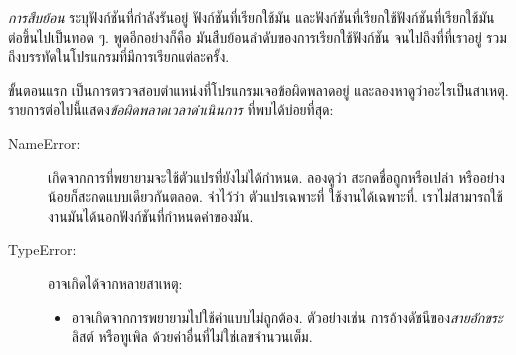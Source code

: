 \textit{การสืบย้อน} ระบุฟังก์ชันที่กำลังรันอยู่
ฟังก์ชันที่เรียกใช้มัน และฟังก์ชันที่เรียกใช้ฟังก์ชันที่เรียกใช้มัน ต่อขึ้นไปเป็นทอด ๆ.
พูดอีกอย่างก็คือ
มันสืบย้อนลำดับของการเรียกใช้ฟังก์ชัน จนไปถึงที่ที่เราอยู่ รวมถึงบรรทัดในโปรแกรมที่มีการเรียกแต่ละครั้ง.


ขั้นตอนแรก เป็นการตรวจสอบตำแหน่งที่โปรแกรมเจอข้อผิดพลาดอยู่
และลองหาดูว่าอะไรเป็นสาเหตุ.
รายการต่อไปนี้แสดง\textit{ข้อผิดพลาดเวลาดำเนินการ} ที่พบได้บ่อยที่สุด:

\begin{description}


\item[NameError:]  
เกิดจากการที่พยายามจะใช้ตัวแปรที่ยังไม่ได้กำหนด.
ลองดูว่า สะกดชื่อถูกหรือเปล่า หรืออย่างน้อยก็สะกดแบบเดียวกันตลอด.
จำไว้ว่า ตัวแปรเฉพาะที่ ใช้งานได้เฉพาะที่.
เราไม่สามารถใช้งานมันได้นอกฟังก์ชันที่กำหนดค่าของมัน.


\item[TypeError:] อาจเกิดได้จากหลายสาเหตุ:


\begin{itemize}


\item อาจเกิดจากการพยายามไปใช้ค่าแบบไม่ถูกต้อง.
ตัวอย่างเช่น การอ้างดัชนีของ\textit{สายอักขระ}
ลิสต์ หรือทูเพิล ด้วยค่าอื่นที่ไม่ใช่เลขจำนวนเต็ม.



\end{itemize}
\end{description}
